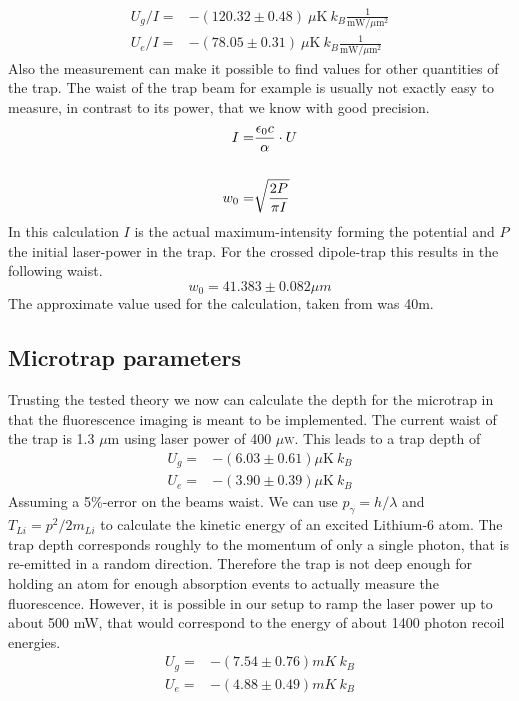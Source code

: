 \begin{align}
U_g/I=&-(120.32\pm 0.48)\ \mu\mathrm{K}\ k_B\frac{1}{\mathrm{mW}/\mu \mathrm{m}^2}\\
U_e/I=&-(78.05\pm 0.31)\ \mu\mathrm{K}\ k_B\frac{1}{\mathrm{mW}/\mu \mathrm{m}^2}
\end{align}
Also the measurement can make it possible to find values for other quantities of the trap. The waist of the trap beam for example is usually not exactly easy to measure, in contrast to its power, that we know with good precision.
\begin{align}
I=&\frac{\epsilon_0 c}{\alpha}\cdot U\\\notag\\
w_0=&\sqrt{\frac{2P}{\pi I}}
\end{align}
In this calculation $I$ is the actual maximum-intensity forming the potential and $P$ the initial laser-power in the trap. For the crossed dipole-trap this results in the following waist.
\begin{equation}
w_0=41.383\pm 0.082\unit{\mu m}
\end{equation}
The approximate value used for the calculation, taken from \cite{lompe} was 40\mu m.

\subsection{Microtrap parameters}

Trusting the tested theory we now can calculate the depth for the microtrap in that the fluorescence imaging is meant to be implemented. The current waist of the trap is 1.3 $\mu$m using laser power of 400 $\mu$\textsc{w}. This leads to a trap depth of
\begin{align}
U_g=&-(6.03\pm 0.61)\mu\mathrm{K}\ k_B\\
U_e=&-(3.90\pm 0.39)\mu\mathrm{K}\ k_B
\end{align}
Assuming a 5\%-error on the beams waist. We can use $p_\gamma=h/\lambda$ and $T_{Li}=p^2/2m_{Li}$ to calculate the kinetic energy of an excited Lithium-6 atom. The trap depth corresponds roughly to the momentum of only a single photon, that is re-emitted in a random direction. Therefore the trap is not deep enough for holding an atom for enough absorption events to actually measure the fluorescence. However, it is possible in our setup to ramp the laser power up to about 500 mW, that would correspond to the energy of about 1400 photon recoil energies.
\begin{align}
U_g=&-(7.54\pm 0.76)\unit{mK}\ k_B\\
U_e=&-(4.88\pm 0.49)\unit{mK}\ k_B
\end{align}

